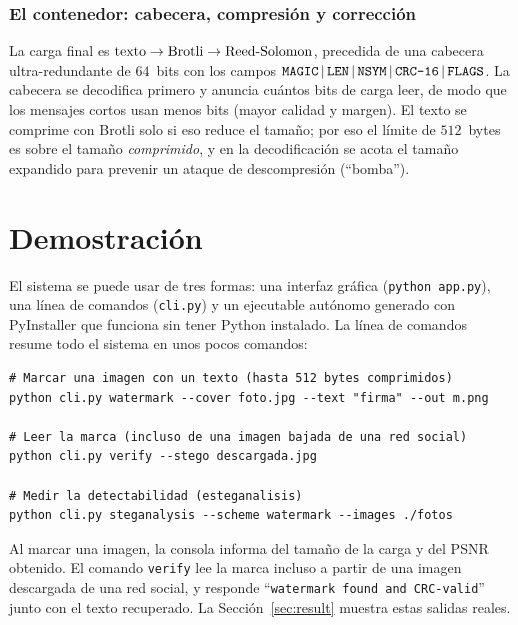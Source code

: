 \documentclass[12pt,a4paper]{article}
\renewcommand{\nobreakdash}{}
\begin{document}
\subsubsection*{El contenedor: cabecera, compresión y corrección}
La carga final es $\text{texto}\to\text{Brotli}\to\text{Reed\text{-}Solomon}$, precedida de
una cabecera ultra\nobreakdash-redundante de $64$~bits con los campos
$\texttt{MAGIC}\,|\,\texttt{LEN}\,|\,\texttt{NSYM}\,|\,\texttt{CRC\text{-}16}\,|\,\texttt{FLAGS}$.
La cabecera se decodifica primero y anuncia cuántos bits de carga leer, de modo que los
mensajes cortos usan menos bits (mayor calidad y margen). El texto se comprime con Brotli
solo si eso reduce el tamaño; por eso el límite de $512$~bytes es sobre el tamaño
\emph{comprimido}, y en la decodificación se acota el tamaño expandido para prevenir un
ataque de descompresión (``bomba'').

\section{Demostración}

El sistema se puede usar de tres formas: una interfaz gráfica (\texttt{python app.py}), una
línea de comandos (\texttt{cli.py}) y un ejecutable autónomo generado con PyInstaller que
funciona sin tener Python instalado. La línea de comandos resume todo el sistema en unos
pocos comandos:

{\footnotesize
\begin{verbatim}
# Marcar una imagen con un texto (hasta 512 bytes comprimidos)
python cli.py watermark --cover foto.jpg --text "firma" --out m.png

# Leer la marca (incluso de una imagen bajada de una red social)
python cli.py verify --stego descargada.jpg

# Medir la detectabilidad (esteganalisis)
python cli.py steganalysis --scheme watermark --images ./fotos
\end{verbatim}
}

Al marcar una imagen, la consola informa del tamaño de la carga y del PSNR obtenido. El
comando \texttt{verify} lee la marca incluso a partir de una imagen descargada de una red
social, y responde ``\texttt{watermark found and CRC-valid}'' junto con el texto recuperado.
La Sección~\ref{sec:result} muestra estas salidas reales.
\end{document}
